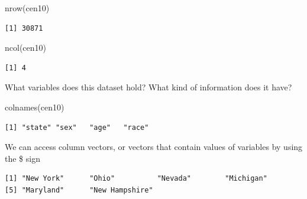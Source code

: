 \documentclass[
  letterpaper,
]{book}
\newenvironment{Shaded}{\begin{snugshade}}{\end{snugshade}}
\newcommand{\FunctionTok}[1]{\textcolor[rgb]{0.28,0.35,0.67}{#1}}
\newcommand{\NormalTok}[1]{\textcolor[rgb]{0.00,0.23,0.31}{#1}}
\newcommand{\SpecialCharTok}[1]{\textcolor[rgb]{0.37,0.37,0.37}{#1}}
\theoremstyle{definition}
\theoremstyle{definition}
\theoremstyle{plain}
\theoremstyle{definition}
\theoremstyle{plain}
\theoremstyle{plain}
\theoremstyle{remark}
\begin{document}
\begin{Shaded}
\begin{Highlighting}[]
\FunctionTok{nrow}\NormalTok{(cen10)}
\end{Highlighting}
\end{Shaded}

\begin{verbatim}
[1] 30871
\end{verbatim}

\begin{Shaded}
\begin{Highlighting}[]
\FunctionTok{ncol}\NormalTok{(cen10)}
\end{Highlighting}
\end{Shaded}

\begin{verbatim}
[1] 4
\end{verbatim}

What variables does this dataset hold? What kind of information does it
have?

\begin{Shaded}
\begin{Highlighting}[]
\FunctionTok{colnames}\NormalTok{(cen10)}
\end{Highlighting}
\end{Shaded}

\begin{verbatim}
[1] "state" "sex"   "age"   "race" 
\end{verbatim}

We can access column vectors, or vectors that contain values of
variables by using the \$ sign

\begin{Shaded}
\end{Shaded}

\begin{verbatim}
[1] "New York"      "Ohio"          "Nevada"        "Michigan"     
[5] "Maryland"      "New Hampshire"
\end{verbatim}

\begin{Shaded}
\end{Shaded}
\end{document}
